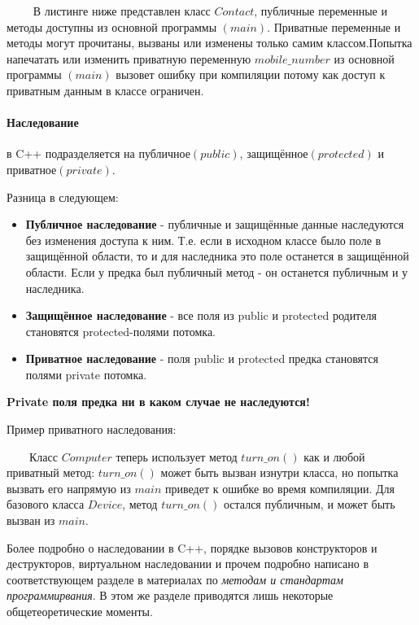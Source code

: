 $\qquad$ В листинге ниже представлен класс $Contact$, публичные переменные и методы доступны из основной программы $(main)$. Приватные переменные и методы могут прочитаны, вызваны или изменены только самим классом.Попытка напечатать или изменить приватную переменную $mobile\_number$ из основной программы $(main)$ вызовет ошибку при компиляции потому как доступ к приватным данным в классе ограничен.
\newpage
\lstset{language=C++, keepspaces = true, extendedchars=\false}

\newpage
\paragraph{Наследование} в C++ подразделяется на публичное$(public)$, защищённое$(protected)$ и приватное$(private)$.

Разница в следующем:
\begin{itemize}
    \item \textbf{Публичное наследование} - публичные и защищённые данные наследуются без изменения доступа к ним. Т.е. если в исходном классе было поле в защищённой области, то и для наследника это поле останется в защищённой области. Если у предка был публичный метод - он останется публичным и у наследника. 
    \item \textbf{Защищённое наследование} - все поля из public и protected родителя становятся protected-полями потомка.
    \item \textbf{Приватное наследование} - поля public и protected предка становятся полями private потомка.
\end{itemize}
\begin{notice}
    \textbf{Private поля предка ни в каком случае не наследуются!}
\end{notice}

Пример приватного наследования:
\lstset{language=C++}


$\qquad$Класс $Computer$ теперь использует метод $turn\_on()$ как и любой приватный метод: $turn\_on()$ может быть вызван изнутри класса, но попытка вызвать его напрямую из $main$ приведет к ошибке во время компиляции. Для базового класса $Device$, метод $turn\_on()$ остался публичным, и может быть вызван из $main$.

\begin{notice}
    Более подробно о наследовании в C++, порядке вызовов конструкторов и деструкторов, виртуальном наследовании и прочем подробно написано в соответствующем разделе в материалах по \textit{методам и стандартам программирвания}. В этом же разделе приводятся лишь некоторые общетеоретические моменты.
\end{notice}

